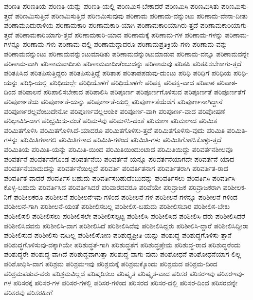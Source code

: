 {ಪರಿಣತಿ
ಪರಿಣತಿಯ
ಪರಿಣತಿ-ಯನ್ನು
ಪರಿಣತಿ-ಯಲ್ಲಿ
ಪರಿಣಮಿಸ-ಬೇಕಾದರೆ
ಪರಿಣಮಿಸಿ
ಪರಿಣಮಿಸಿತು
ಪರಿಣಮಿಸು-ತ್ತದೆ
ಪರಿಣಮಿಸುತ್ತಿದೆ
ಪರಿಣಮಿಸುತ್ತಿವೆ
ಪರಿಣಮಿಸುವುವು
ಪರಿಣಾಮ
ಪರಿಣಾಮ-ವನ್ನುಂಟು
ಪರಿಣಾಮ-ವೇನಾ-ದೀತು
ಪರಿಣಾಮಎದುರಾಳಿಯ
ಪರಿಣಾಮಕಾರಿ
ಪರಿಣಾಮಕಾರಿ-ಯಾಗಿ
ಪರಿಣಾಮಕಾರಿಯಾಗಿರು-ತ್ತದೆ
ಪರಿಣಾಮಕಾರಿಯಾಗು-ತ್ತದೆ
ಪರಿಣಾಮಕಾರಿಯಾಗು-ತ್ತವೆ
ಪರಿಣಾಮಕಾರಿ-ಯಾದ
ಪರಿಣಾಮಕ್ಕೆ
ಪರಿಣಾಮ-ಗಳ
ಪರಿಣಾಮ-ಗಳನ್ನು
ಪರಿಣಾಮ-ಗಳನ್ನೂ
ಪರಿಣಾಮ-ಗಳು
ಪರಿಣಾಮ-ದಲ್ಲಿ
ಪರಿಣಾಮದ್ದಾದರೂ
ಪರಿಣಾಮಪ್ರತಿಕ್ರಿಯೆ-ಗಳು
ಪರಿಣಾಮ-ವನ್ನು
ಪರಿಣಾಮವನ್ನುಂಟು
ಪರಿಣಾಮವನ್ನುಂಟುಮಾಡಿತು
ಪರಿಣಾಮವನ್ನುಂಟುಮಾಡುವ
ಪರಿಣಾಮ-ವನ್ನೂ
ಪರಿಣಾಮವನ್ನೇ
ಪರಿಣಾಮ-ವಾಗಿ
ಪರಿಣಾಮವಾದೀತು
ಪರಿಣಾಮವಾದೀತೆಂಬುದನ್ನು
ಪರಿಣಾಮವು
ಪರಿತಪಿ
ಪರಿತಪಿಸಬೇಕಾಗು-ತ್ತದೆ
ಪರಿತಪಿಸಿದ
ಪರಿತಪಿಸುತ್ತಿದ್ದರು
ಪರಿತಪಿಸುತ್ತಿದ್ದೆ
ಪರಿತಾಪ
ಪರಿತಾಪಪಡುವು-ದುಂಟು
ಪರಿಧಿ
ಪರಿಧಿಗೆ
ಪರಿಧಿಯ
ಪರಿಧಿ-ಯನ್ನು
ಪರಿಧಿ-ಯಲ್ಲಿ
ಪರಿಧಿಯಲ್ಲೇ
ಪರಿಧಿಯೊಳಗೆ
ಪರಿಧಿಯೊಳಗೇ
ಪರಿಪಕ್ವ
ಪರಿಪಕ್ವ-ವಾದ
ಪರಿಪಾಠ
ಪರಿಪಾಠ-ದಿಂದ
ಪರಿಪಾಲನೆ
ಪರಿಪಾಲಿಸಬೇಕಾದ
ಪರಿಪಾಲಿಸಿ
ಪರಿಪೂರ್ಣ
ಪರಿಪೂರ್ಣಗೊಳಿಸುವ
ಪರಿಪೂರ್ಣತೆ
ಪರಿಪೂರ್ಣತೆಗೆ
ಪರಿಪೂರ್ಣತೆಯ
ಪರಿಪೂರ್ಣತೆ-ಯನ್ನು
ಪರಿಪೂರ್ಣತೆ-ಯಲ್ಲಿ
ಪರಿಪೂರ್ಣತೆಯೆಡೆಗೆ
ಪರಿಪೂರ್ಣನಾಗಿದ್ದಾನೆ
ಪರಿಪೂರ್ಣರಲ್ಲವೆಂಬುದೇನೋ
ಪರಿಪೂರ್ಣವಲ್ಲಆಂಶಿಕ
ಪರಿಪೂರ್ಣ-ವಾಗಿ
ಪರಿಪೂರ್ಣ-ವಾದ
ಪರಿಪೋಷಣೆ
ಪರಿಭಾವಿಸಿ-ದಾಗ
ಪರಿಭ್ರಮಿಸು-ವಂತೆ
ಪರಿಮಳವು
ಪರಿಮಳಿಸಿ-ದಂತೆ
ಪರಿಮಾಣ
ಪರಿಮಾಣದ
ಪರಿಮಿತ
ಪರಿಮಿತಗೊಳಿಸಿ
ಪರಿಮಿತಗೊಳಿಸಿದೆ-ಯಾದರೂ
ಪರಿಮಿತಗೊಳಿಸು-ತ್ತದೆ
ಪರಿಮಿತಗೊಳಿಸು-ವುದು
ಪರಿಮಿತಿ
ಪರಿಮಿತಿ-ಗಳನ್ನು
ಪರಿಮಿತಿಗಳಾಗಲಿ
ಪರಿಮಿತಿಗಳಾದ
ಪರಿಮಿತಿ-ಗಳಿಂದ
ಪರಿಮಿತಿ-ಗಳು
ಪರಿಮಿತಿಗೊಳಿಸಿಕೊಳ್ಳು-ತ್ತದೆ
ಪರಿಮಿತಿಯ
ಪರಿಮಿತಿ-ಯನ್ನು
ಪರಿಮಿತಿ-ಯಿಂದ
ಪರಿಮಿತಿಯಿಂದುಂಟಾದ
ಪರಿಮಿತಿಯಿದ್ದು
ಪರಿವರ್ತನಶೀಲವೂ
ಪರಿವರ್ತನೆ
ಪರಿವರ್ತನೆಗೊಂಡ
ಪರಿವರ್ತನೆಯ
ಪರಿವರ್ತನೆ-ಯನ್ನೂ
ಪರಿವರ್ತನೆಯಾಗದೇ
ಪರಿವರ್ತನೆ-ಯಾದ
ಪರಿವರ್ತನೆಯಾದುದನ್ನು
ಪರಿವರ್ತನೆಯಿಲ್ಲದೆ
ಪರಿವರ್ತಿ
ಪರಿವರ್ತಿತನಾಗ
ಪರಿವರ್ತಿತರಾಗಿ
ಪರಿವರ್ತಿತ-ರಾದ
ಪರಿವರ್ತಿತ-ವಾದರೆ
ಪರಿವರ್ತಿಸ-ಬಹುದು
ಪರಿವರ್ತಿಸಬಹುದೆಂಬುದನ್ನು
ಪರಿವರ್ತಿಸಲು
ಪರಿವರ್ತಿಸಿ
ಪರಿವರ್ತಿಸಿ-ಕೊಳ್ಳ-ಬಹುದು
ಪರಿವರ್ತಿಸಿದ
ಪರಿವರ್ತಿಸಿದರೆ
ಪರಿವಾರದವರೂ
ಪರಿವೆಯೇ
ಪರಿವ್ರಾಜಕ
ಪರಿವ್ರಾಜಕರಾಗಿ
ಪರಿಶೀಲಕ-ನಿಗೆ
ಪರಿಶೀಲಕರೂ
ಪರಿಶೀಲನೆ
ಪರಿಶೀಲನೆಇವು-ಗಳಿಂದ
ಪರಿಶೀಲನೆ-ಗಳ
ಪರಿಶೀಲನೆ-ಗಳನ್ನೂ
ಪರಿಶೀಲನೆ-ಗಳಿಂದ
ಪರಿಶೀಲನೆ-ಗಾಗಿ
ಪರಿಶೀಲನೆ-ಯಂತೆ
ಪರಿಶೀಲಿಸಬಲ್ಲ
ಪರಿಶೀಲಿಸ-ಬಹುದು
ಪರಿಶೀಲಿಸಬಾರ
ಪರಿಶೀಲಿಸ-ಬೇಕು
ಪರಿಶೀಲಿಸಲಿ
ಪರಿಶೀಲಿಸಲು
ಪರಿಶೀಲಿಸಲೇ
ಪರಿಶೀಲಿಸಲ್ಪಟ್ಟ
ಪರಿಶೀಲಿಸಿ
ಪರಿಶೀಲಿಸಿದ
ಪರಿಶೀಲಿಸಿ-ದರು
ಪರಿಶೀಲಿಸಿದರೆ
ಪರಿಶೀಲಿಸಿದವನು
ಪರಿಶೀಲಿಸಿ-ದಾಗ
ಪರಿಶೀಲಿಸಿದೆ
ಪರಿಶೀಲಿಸಿದೆವು
ಪರಿಶೀಲಿಸಿದ್ದರು
ಪರಿಶೀಲಿಸಿ-ದ್ದಾರೆ
ಪರಿಶೀಲಿಸಿದ್ದೀರಾ
ಪರಿಶೀಲಿಸುವ
ಪರಿಶೀಲಿಸು-ವುದಿಲ್ಲ
ಪರಿಶೀಲಿಸೋಣ
ಪರಿಶುದ್ದಪ್ರೀತಿ-ಯನ್ನು
ಪರಿಶುದ್ಧ
ಪರಿಶುದ್ಧಗೊಳಿಸು-ತ್ತಾನೆ
ಪರಿಶುದ್ಧಗೊಳಿಸುವು-ದಕ್ಕಾಗಿಯೇ
ಪರಿಶುದ್ಧತೆ-ಗಾಗಿ
ಪರಿಶುದ್ಧತೆಗೆ
ಪರಿಶುದ್ಧಪ್ರೇಮ
ಪರಿಶುದ್ಧ-ರಾದ
ಪರಿಶುದ್ಧರೆಂದು
ಪರಿಶುದ್ಧರೇ
ಪರಿಶುದ್ಧ-ವಾಗಿದೆ
ಪರಿಶುದ್ಧವಾಗುತ್ತಾ
ಪರಿಶುದ್ಧ-ವಾಗು-ವುದು
ಪರಿಶೋಧನೆ
ಪರಿಶೋಧನೆಯಾಗ-ಲಿಲ್ಲ
ಪರಿಶೋಧಿಸಿ-ದಾಗ
ಪರಿಶ್ರಮ
ಪರಿಶ್ರಮಇವು
ಪರಿಶ್ರಮಕ್ಕೆ
ಪರಿಶ್ರಮಕ್ಕೊಂದು
ಪರಿಶ್ರಮದ
ಪರಿಶ್ರಮ-ದಿಂದ
ಪರಿಶ್ರಮಪಡುವ-ವರು
ಪರಿಶ್ರಮವಿಲ್ಲದೆ
ಪರಿಷ್ಕರಿಸಲು
ಪರಿಷ್ಕೃತ
ಪರಿಷ್ಕೃತ-ವಾದ
ಪರಿಸರ
ಪರಿಸರಇವು
ಪರಿಸರಇವು-ಗಳ
ಪರಿಸರಕ್ಕೆ
ಪರಿಸರ-ಗಳ
ಪರಿಸರ-ಗಳಲ್ಲಿ
ಪರಿಸರ-ಗಳಿಂದ
ಪರಿಸರದ
ಪರಿಸರ-ದಲ್ಲಿ
ಪರಿಸರ-ದಿಂದ
ಪರಿಸರವನ್ನೇ
ಪರಿಸರವು
ಪರಿಸರಹೀಗೆ
}
